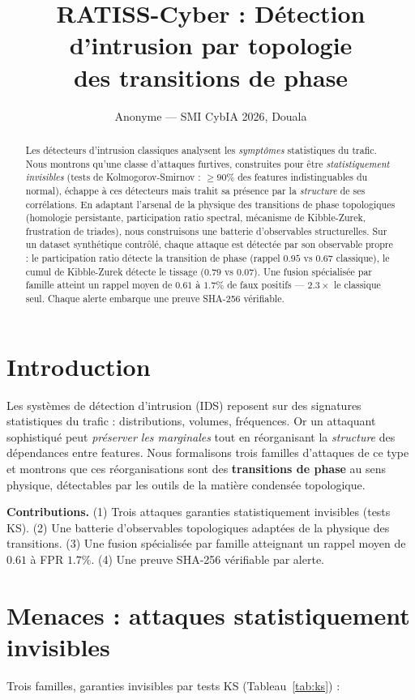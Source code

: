 \documentclass[11pt,twocolumn]{article}
\title{RATISS-Cyber : Détection d'intrusion par topologie\\
des transitions de phase}
\author{Anonyme --- SMI CybIA 2026, Douala}
\date{}
\begin{document}
\maketitle

\begin{abstract}
Les détecteurs d'intrusion classiques analysent les \emph{symptômes}
statistiques du trafic. Nous montrons qu'une classe d'attaques furtives,
construites pour être \emph{statistiquement invisibles} (tests de
Kolmogorov-Smirnov : $\geq 90\%$ des features indistinguables du normal),
échappe à ces détecteurs mais trahit sa présence par la \emph{structure} de
ses corrélations. En adaptant l'arsenal de la physique des transitions de
phase topologiques (homologie persistante, participation ratio spectral,
mécanisme de Kibble-Zurek, frustration de triades), nous construisons une
batterie d'observables structurelles. Sur un dataset synthétique contrôlé,
chaque attaque est détectée par son observable propre : le participation
ratio détecte la transition de phase (rappel $0.95$ vs $0.67$ classique), le
cumul de Kibble-Zurek détecte le tissage ($0.79$ vs $0.07$). Une fusion
spécialisée par famille atteint un rappel moyen de $0.61$ à $1.7\%$ de faux
positifs --- $2.3\times$ le classique seul. Chaque alerte embarque une preuve
SHA-256 vérifiable.
\end{abstract}

\section{Introduction}
Les systèmes de détection d'intrusion (IDS) reposent sur des signatures
statistiques du trafic : distributions, volumes, fréquences. Or un attaquant
sophistiqué peut \emph{préserver les marginales} tout en réorganisant la
\emph{structure} des dépendances entre features. Nous formalisons trois
familles d'attaques de ce type et montrons que ces réorganisations sont des
\textbf{transitions de phase} au sens physique, détectables par les outils de
la matière condensée topologique.

\textbf{Contributions.} (1) Trois attaques garanties statistiquement
invisibles (tests KS). (2) Une batterie d'observables topologiques adaptées
de la physique des transitions. (3) Une fusion spécialisée par famille
atteignant un rappel moyen de $0.61$ à FPR $1.7\%$. (4) Une preuve SHA-256
vérifiable par alerte.

\section{Menaces : attaques statistiquement invisibles}
Trois familles, garanties invisibles par tests KS (Tableau~\ref{tab:ks}) :
\end{document}
